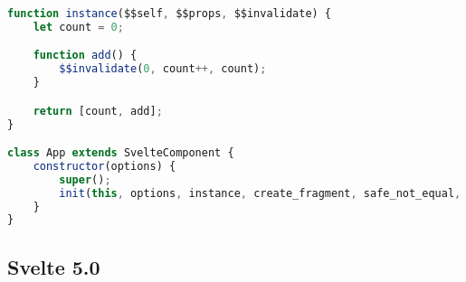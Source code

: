 \begin{lstlisting}[caption={Počítadlo po kompilaci}, label={svelte-counter-compiled}, language=JavaScript]
function instance($$self, $$props, $$invalidate) {
    let count = 0;

    function add() {
        $$invalidate(0, count++, count);
    }

    return [count, add];
}

class App extends SvelteComponent {
    constructor(options) {
        super();
        init(this, options, instance, create_fragment, safe_not_equal, {});
    }
}
\end{lstlisting}

\subsection{Svelte 5.0}

